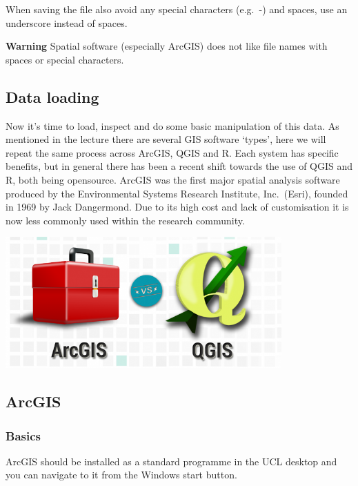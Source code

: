 \documentclass[]{book}
\begin{document}
When saving the file also avoid any special characters (e.g.~-) and spaces, use an underscore instead of spaces.

\textbf{Warning} Spatial software (especially ArcGIS) does not like file names with spaces or special characters.

\hypertarget{data-loading}{%
\subsection{Data loading}\label{data-loading}}

Now it's time to load, inspect and do some basic manipulation of this data. As mentioned in the lecture there are several GIS software `types', here we will repeat the same process across ArcGIS, QGIS and R. Each system has specific benefits, but in general there has been a recent shift towards the use of QGIS and R, both being opensource. ArcGIS was the first major spatial analysis software produced by the Environmental Systems Research Institute, Inc.~(Esri), founded in 1969 by Jack Dangermond. Due to its high cost and lack of customisation it is now less commonly used within the research community.

\begin{center}\includegraphics[width=300pt]{prac1_images/ArcGISvsQGIS} \end{center}

\hypertarget{arcgis}{%
\subsection{ArcGIS}\label{arcgis}}

\hypertarget{basics}{%
\subsubsection{Basics}\label{basics}}

ArcGIS should be installed as a standard programme in the UCL desktop and you can navigate to it from the Windows start button.
\end{document}
